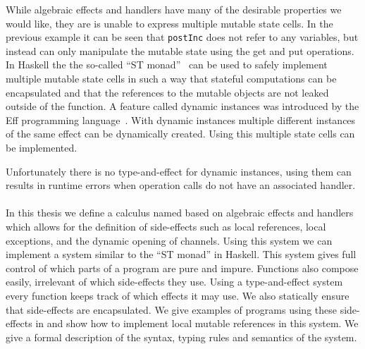 While algebraic effects and handlers have many of the desirable properties we would like, they are is unable to express multiple mutable state cells.
In the previous example it can be seen that \texttt{postInc} does not refer to any variables, but instead can only manipulate the mutable state using the get and put operations.
In Haskell the the so-called ``ST monad''~\cite{runst} can be used to safely implement multiple mutable state cells in such a way that stateful computations can be encapsulated and that the references to the mutable objects are not leaked outside of the function. 
A feature called dynamic instances was introduced by the Eff programming language~\cite{eff1}.
With dynamic instances multiple different instances of the same effect can be dynamically created.
Using this multiple state cells can be implemented.
\iffalse
Eff also introduced a construct called \emph{resources}.
Resources are an effect instance with a globally scoped handler associated.
Having a globally scoped handler means operation calls on an instance with a resource can never escape their scope and will always be handled.
\fi
Unfortunately there is no type-and-effect for dynamic instances, using them can results in runtime errors when operation calls do not have an associated handler.
\\\\
In this thesis we define a calculus named \lang{} based on algebraic effects and handlers which allows for the definition of side-effects such as local references, local exceptions, and the dynamic opening of channels.
Using this system we can implement a system similar to the ``ST monad'' in Haskell.
This system gives full control of which parts of a program are pure and impure.
Functions also compose easily, irrelevant of which side-effects they use.
Using a type-and-effect system every function keeps track of which effects it may use.
We also statically ensure that side-effects are encapsulated.
We give examples of programs using these side-effects in \lang{} and show how to implement local mutable references in this system.
We give a formal description of the syntax, typing rules and semantics of the system.

